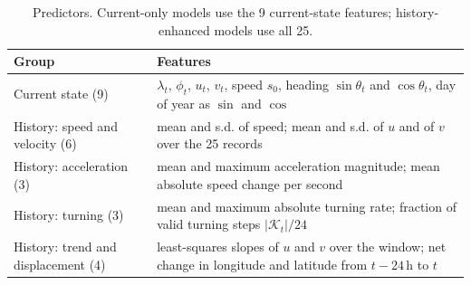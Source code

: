 \begin{table}[!htbp]
\centering
\caption{Predictors. Current-only models use the 9 current-state features; history-enhanced models use all 25.}
\label{tab:features}
\small
\begin{tabularx}{\textwidth}{@{}lX@{}}
\toprule
Group & Features \\
\midrule
Current state (9) & $\lambda_t$, $\phi_t$, $u_t$, $v_t$, speed $s_0$, heading $\sin\theta_t$ and $\cos\theta_t$, day of year as $\sin$ and $\cos$ \\
\addlinespace
History: speed and velocity (6) & mean and s.d. of speed; mean and s.d. of $u$ and of $v$ over the 25 records \\
History: acceleration (3) & mean and maximum acceleration magnitude; mean absolute speed change per second \\
History: turning (3) & mean and maximum absolute turning rate; fraction of valid turning steps $|\mathcal{K}_t|/24$ \\
History: trend and displacement (4) & least-squares slopes of $u$ and $v$ over the window; net change in longitude and latitude from $t-24$\,h to $t$ \\
\bottomrule
\end{tabularx}
\end{table}

